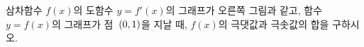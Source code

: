\noindent\begin{minipage}[t]{0.58\linewidth}\vspace{0pt}\raggedright 삼차함수 $f(x)$의 도함수 $y=f'(x)$의 그래프가 오른쪽 그림과 같고, 함수 $y=f(x)$의 그래프가 점~$(0{,}\mkern3mu\mathopen{}1)$을 지날 때, $f(x)$의 극댓값과 극솟값의 합을 구하시오.\end{minipage}\hfill\begin{minipage}[t]{0.4\linewidth}\vspace{0pt}\centering \resizebox{\ifdim\width>\linewidth\linewidth\else\width\fi}{!}{}\end{minipage}\par
